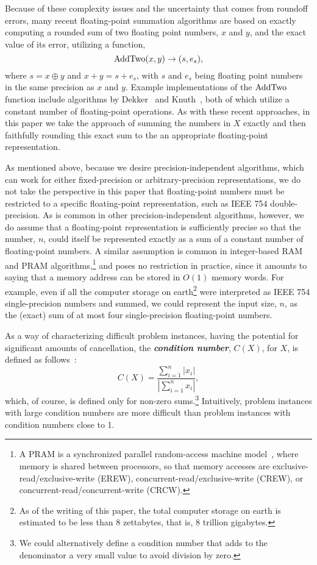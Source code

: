 \documentclass[11pt]{article}
\renewcommand{\emph}[1]{\textit{\textbf{#1}}}
\begin{document}
Because of these complexity issues and the uncertainty that comes
from roundoff errors, many recent 
floating-point summation algorithms are based 
on exactly computing a rounded
sum of two floating point numbers, $x$ and $y$,
and the exact value of its error, utilizing a function,
\newcommand{\add}{{\rm AddTwo}}
\[
\add(x,y) \rightarrow (s,e_s),
\]
where $s = x\oplus y$ and $x+y = s+e_s$, with $s$ and $e_s$ being
floating point numbers in the same precision as $x$ and $y$.
Example implementations of the $\add$ function include algorithms
by Dekker~\cite{dekker}
and Knuth~\cite{Knuth:1997:ACP:270146},
both of which utilize a constant number of floating-point operations.
As with these recent approaches, in this paper we take the approach
of summing the numbers in $X$ exactly and then 
faithfully rounding this exact sum to the an appropriate
floating-point representation.

As mentioned above,
because we desire precision-independent algorithms, which can work
for either fixed-precision or arbitrary-precision representations, 
we do not take the perspective in this paper that 
floating-point numbers must 
be restricted to a specific floating-point representation, such as
IEEE 754 double-precision.
As is common in other precision-independent algorithms, however, we 
do assume that a floating-point representation is sufficiently precise so
that the number, $n$, could itself be represented exactly as a sum of 
a constant number of floating-point numbers.
A similar assumption is common in integer-based RAM and PRAM 
algorithms,\footnote{A PRAM is a synchronized 
  parallel random-access machine model~\cite{DBLP:books/aw/JaJa92},
  where memory is shared between processors, so that memory accesses are
  exclusive-read/exclusive-write (EREW), concurrent-read/exclusive-write 
  (CREW), or concurrent-read/concurrent-write (CRCW).}
and poses no restriction in practice, since it amounts to saying that
a memory address can be stored in $O(1)$ memory words.
For example, even if all the computer storage on 
earth\footnote{As of the writing of this paper, the total computer storage on
  earth is estimated to be less than $8$ zettabytes, that is, 
  $8$ trillion gigabytes.}
were interpreted
as IEEE 754 single-precision numbers and summed, we could represent 
the input size, $n$, as the (exact) 
sum of at most four single-precision floating-point numbers.

As a way of characterizing difficult problem instances, having the
potential for significant amounts of cancellation, the
\emph{condition number}, $C(X)$, for $X$, is 
defined
as follows~\cite{doi:10.1137/070710020,Zhu:2010:A9O,doi:10.1137/050645671}:
\[
C(X) = \frac{\sum_{i=1}^n |x_i|}{\left|\sum_{i=1}^n x_i \right|},
\]
which, of course, is defined only for non-zero sums.\footnote{We 
could alternatively define a condition number that 
adds to the denominator a very small value 
to avoid division by zero.}
Intuitively, problem instances with large condition numbers are more
difficult than problem instances with condition numbers close to 1.
\end{document}
